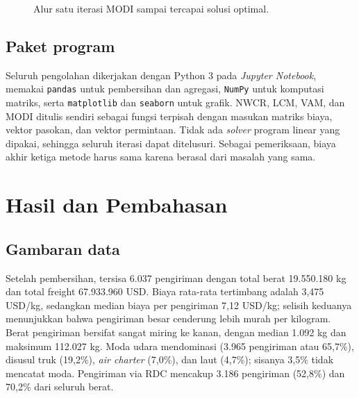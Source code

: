 \documentclass[a4paper,11pt]{article}
\begin{document}
\begin{figure}[tbp]
\centering
{}
\caption{Alur satu iterasi MODI sampai tercapai solusi optimal.}
\label{fig:modi}
\end{figure}

\subsection{Paket program}
Seluruh pengolahan dikerjakan dengan Python 3 pada \textit{Jupyter Notebook}, memakai \texttt{pandas} \cite{mckinney2010} untuk pembersihan dan agregasi, \texttt{NumPy} untuk komputasi matriks, serta \texttt{matplotlib} dan \texttt{seaborn} untuk grafik. NWCR, LCM, VAM, dan MODI ditulis sendiri sebagai fungsi terpisah dengan masukan matriks biaya, vektor pasokan, dan vektor permintaan. Tidak ada \textit{solver} program linear yang dipakai, sehingga seluruh iterasi dapat ditelusuri. Sebagai pemeriksaan, biaya akhir ketiga metode harus sama karena berasal dari masalah yang sama.

\section{Hasil dan Pembahasan}
\label{sec:hasil}

\subsection{Gambaran data}
Setelah pembersihan, tersisa 6.037 pengiriman dengan total berat 19.550.180 kg dan total freight 67.933.960 USD. Biaya rata-rata tertimbang adalah 3,475 USD/kg, sedangkan median biaya per pengiriman 7,12 USD/kg; selisih keduanya menunjukkan bahwa pengiriman besar cenderung lebih murah per kilogram. Berat pengiriman bersifat sangat miring ke kanan, dengan median 1.092 kg dan maksimum 112.027 kg. Moda udara mendominasi (3.965 pengiriman atau 65,7\%), disusul truk (19,2\%), \textit{air charter} (7,0\%), dan laut (4,7\%); sisanya 3,5\% tidak mencatat moda. Pengiriman via RDC mencakup 3.186 pengiriman (52,8\%) dan 70,2\% dari seluruh berat.
\end{document}
